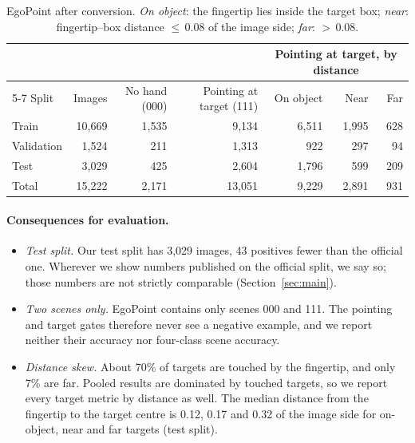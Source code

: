 \begin{table}[t]
  \caption{EgoPoint after conversion. \emph{On object}: the fingertip lies inside the target box; \emph{near}: fingertip--box distance ${\leq}\,0.08$ of the image side; \emph{far}: ${>}\,0.08$.}
  \label{tab:data}
  \footnotesize
  \begin{tabular}{lrrrrrr}
    \toprule
    & & & & \multicolumn{3}{c}{Pointing at target, by distance} \\
    \cmidrule(l){5-7}
    Split & Images & No hand (000) & Pointing at target (111) & On object & Near & Far \\
    \midrule
    Train & 10,669 & 1,535 & 9,134 & 6,511 & 1,995 & 628 \\
    Validation & 1,524 & 211 & 1,313 & 922 & 297 & 94 \\
    Test & 3,029 & 425 & 2,604 & 1,796 & 599 & 209 \\
    \midrule
    Total & 15,222 & 2,171 & 13,051 & 9,229 & 2,891 & 931 \\
    \bottomrule
  \end{tabular}
\end{table}

\paragraph{Consequences for evaluation.}
\begin{itemize}
\item \emph{Test split.} Our test split has 3,029 images, 43 positives fewer than the official one. Wherever we show numbers published on the official split, we say so; those numbers are not strictly comparable (Section~\ref{sec:main}).
\item \emph{Two scenes only.} EgoPoint contains only scenes 000 and 111. The pointing and target gates therefore never see a negative example, and we report neither their accuracy nor four-class scene accuracy.
\item \emph{Distance skew.} About 70\% of targets are touched by the fingertip, and only 7\% are far. Pooled results are dominated by touched targets, so we report every target metric by distance as well. The median distance from the fingertip to the target centre is 0.12, 0.17 and 0.32 of the image side for on-object, near and far targets (test split).
\end{itemize}

